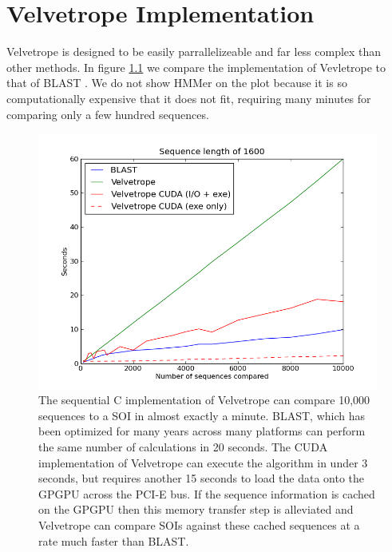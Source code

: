 \documentclass[phd,tocprelim]{cornell}
\begin{document}


\chapter{Velvetrope Implementation} %
\label{cha:Velvetrope Implementation}

Velvetrope is designed to be easily parrallelizeable and far less complex than other methods. In figure \ref{fig:vr06} we compare the implementation of Vevletrope to that of BLAST \cite{BLAST}. We do not show HMMer on the plot because it is so computationally expensive that it does not fit, requiring many minutes for comparing only a few hundred sequences.

\begin{figure}[htp]%
 \centerline{\includegraphics[width=\textwidth]{figures/velvetrope/timersSC.png}}
 \caption[Velvetrope timings]{The sequential C implementation of Velvetrope can compare 10,000 sequences to a SOI in almost exactly a minute. BLAST, which has been optimized for many years across many platforms can perform the same number of calculations in 20 seconds. The CUDA implementation of Velvetrope can execute the algorithm in under 3 seconds, but requires another 15 seconds to load the data onto the GPGPU across the PCI-E bus. If the sequence information is cached on the GPGPU then this memory transfer step is alleviated and Velvetrope can compare SOIs against these cached sequences at a rate much faster than BLAST.}
 	\label{fig:vr06}
 \end{figure}
\end{document}
